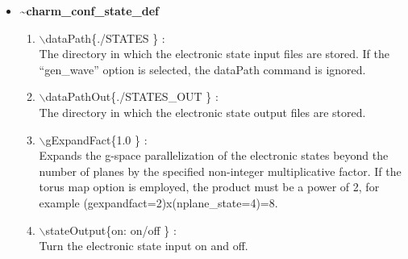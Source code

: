 \documentclass[12pt]{article}
\begin{document}
\begin{itemize}
\clearpage
\huge
\item[] {\bf \~{ }charm\_conf\_state\_def}
\begin{enumerate}
  \vspace{0.15in} \Large
  \item $\backslash$dataPath\{./STATES \} : \\    \large
  The directory in which the electronic state input files are
  stored. If the ``gen\_wave'' option is selected, the dataPath
  command is ignored.
  \vspace{0.15in} \Large
  \item $\backslash$dataPathOut\{./STATES\_OUT \} : \\    \large
  The directory in which the electronic state output files are stored.
  \vspace{0.15in} \Large
  \item $\backslash$gExpandFact\{1.0 \} : \\    \large
  Expands the g-space parallelization of the electronic states beyond the number of planes by
  the specified non-integer multiplicative factor. If the torus map option is
  employed, the product must be a power of 2, for example 
 (gexpandfact=2)x(nplane\_state=4)=8.
  \vspace{0.15in} \Large
  \item $\backslash$stateOutput\{on: on/off \} : \\    \large
  Turn the electronic state input on and off.
\end{enumerate}


\end{itemize}
\end{document}
